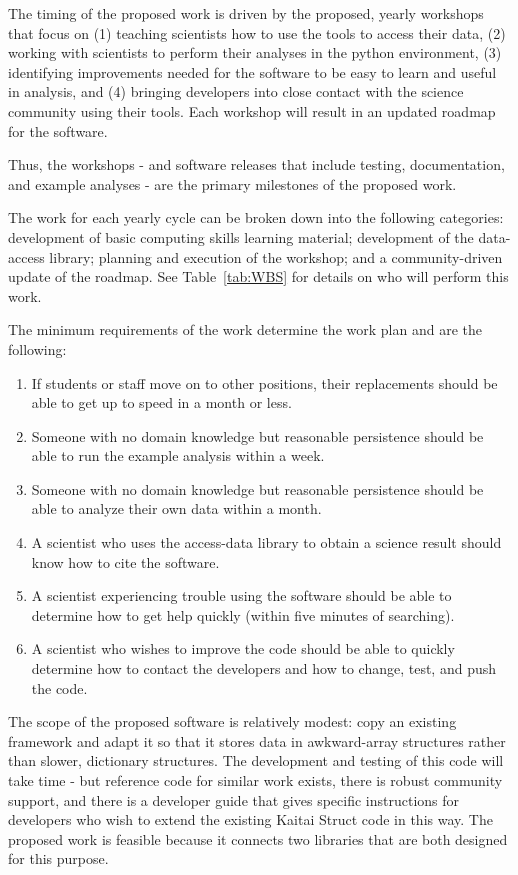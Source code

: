 The timing of the proposed work is driven by the proposed, yearly workshops that focus on (1) teaching scientists how to use the tools to access their data, (2) working with scientists to perform their analyses in the python environment, (3) identifying improvements needed for the software to be easy to learn and useful in analysis, and (4) bringing developers into close contact with the science community using their tools.  Each workshop will result in an updated roadmap for the software.

Thus, the workshops - and software releases that include testing, documentation, and example analyses - are the primary milestones of the proposed work.

The work for each yearly cycle can be broken down into the following categories: development of basic computing skills learning material; development of the data-access library; planning and execution of the workshop; and a community-driven update of the roadmap.  See Table~\ref{tab:WBS} for details on who will perform this work.

The minimum requirements of the work determine the work plan and are the following:

\begin{enumerate}
    \item If students or staff move on to other positions, their replacements should be able to get up to speed in a month or less.
    \item Someone with no domain knowledge but reasonable persistence should be able to run the example analysis within a week.
    \item Someone with no domain knowledge but reasonable persistence should be able to analyze their own data within a month.
    \item A scientist who uses the access-data library to obtain a science result should know how to cite the software.
    \item A scientist experiencing trouble using the software should be able to determine how to get help quickly (within five minutes of searching).
    \item A scientist who wishes to improve the code should be able to quickly determine how to contact the developers and how to change, test, and push the code.
\end{enumerate}

The scope of the proposed software is relatively modest: copy an existing framework and adapt it so that it stores data in awkward-array structures rather than slower, dictionary structures.  The development and testing of this code will take time - but reference code for similar work exists, there is robust community support, and there is a developer guide that gives specific instructions for developers who wish to extend the existing Kaitai Struct code in this way.  The proposed work is feasible because it connects two libraries that are both designed for this purpose.

